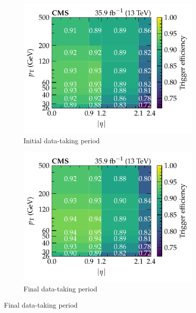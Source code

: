 \begin{figure}[htb]
    \centering
    \begin{subfigure}[b]{0.49\textwidth}
        \centering
        \includegraphics{chapters/041_corrections/images/efficiencies/triggers/muons/muon_RunBCDEF_trigger_efficiency.pdf}
        \caption{Initial data-taking period}
        \label{subfiga:muon-trigger-efficiency}
    \end{subfigure}
    \hfill
    \begin{subfigure}[b]{0.49\textwidth}
        \centering
        \includegraphics{chapters/041_corrections/images/efficiencies/triggers/muons/muon_RunGH_trigger_efficiency.pdf}
        \caption{Final data-taking period}
        \label{subfigb:muon-trigger-efficiency}

\end{subfigure}
\end{figure}
